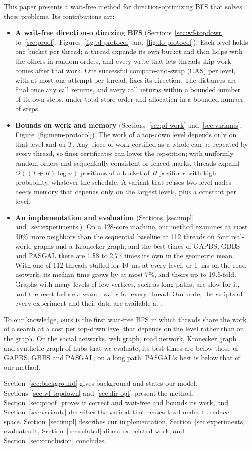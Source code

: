 This paper presents a wait-free method for direction-optimizing BFS that solves these problems. Its contributions are:
\begin{itemize}
    \item \textbf{A wait-free direction-optimizing BFS} (Sections~\ref{sec:wf-topdown} to~\ref{sec:proof}, Figures~\ref{fig:td-protocol} and~\ref{fig:do-protocol}). Each level holds one bucket per thread; a thread expands its own bucket and then helps with the others in random orders, and every write that lets threads skip work comes after that work. One successful compare-and-swap (CAS) per level, with at most one attempt per thread, fixes its direction. The distances are final once any call returns, and every call returns within a bounded number of its own steps, under total store order and allocation in a bounded number of steps.
    \item \textbf{Bounds on work and memory} (Sections~\ref{sec:pf-work} and~\ref{sec:variants}, Figure~\ref{fig:mem-protocol}). The work of a top-down level depends only on that level and on $T$. Any piece of work certified as a whole can be repeated by every thread, so finer certificates can lower the repetition; with uniformly random orders and sequentially consistent or fenced marks, threads expand $O((T + R)\log n)$ positions of a bucket of $R$ positions with high probability, whatever the schedule. A variant that reuses two level nodes needs memory that depends only on the largest levels, plus a constant per level.
    \item \textbf{An implementation and evaluation} (Sections~\ref{sec:impl} and~\ref{sec:experiments}). On a 128-core machine, our method examines at most 30\% more neighbors than the sequential baseline at 112 threads on four real-world graphs and a Kronecker graph, and the best times of GAPBS, GBBS and PASGAL there are 1.58 to 2.77 times its own in the geometric mean. With one of 112 threads stalled for 10~ms at every level, or 1~ms on the road network, its median time grows by at most 7\%, and theirs up to 19.5-fold. Graphs with many levels of few vertices, such as long paths, are slow for it, and the reset before a search waits for every thread. Our code, the scripts of every experiment and their data are available at \codeurl.
\end{itemize}
To our knowledge, ours is the first wait-free BFS in which threads share the work of a search at a cost per top-down level that depends on the level rather than on the graph. On the social networks, web graph, road network, Kronecker graph and synthetic graph of hubs that we evaluate, its best times are below those of GAPBS, GBBS and PASGAL; on a long path, PASGAL's best is below that of our method.

Section~\ref{sec:background} gives background and states our model. Sections~\ref{sec:wf-topdown} and~\ref{sec:dir-opt} present the method, Section~\ref{sec:proof} proves it correct and wait-free and bounds its work, and Section~\ref{sec:variants} describes the variant that reuses level nodes to reduce space. Section~\ref{sec:impl} describes our implementation, Section~\ref{sec:experiments} evaluates it, Section~\ref{sec:related} discusses related work, and Section~\ref{sec:conclusion} concludes.
